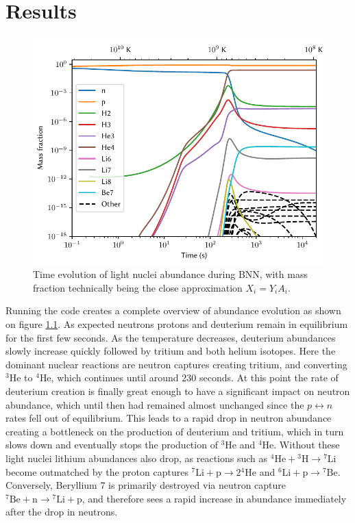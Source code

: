 \chapter{Results}
\label{chap:Results}
\begin{figure}[ht]
    \includegraphics[width=5.1in]{figures/abundancelight.pdf}
    \caption{Time evolution of light nuclei abundance during BNN, with mass fraction technically being the close approximation $X_i=Y_i A_i$. }
    \label{fig:lightXevo}
\end{figure}
Running the code creates a complete overview of abundance evolution as shown on figure \ref{fig:lightXevo}. As expected neutrons protons and deuterium remain in equilibrium for the first few seconds. As the temperature decreases, deuterium abundances slowly increase quickly followed by tritium and both helium isotopes. Here the dominant nuclear reactions are neutron captures creating tritium, and converting ${}^3$He to ${}^4$He, which continues until around 230 seconds. At this point the rate of deuterium creation is finally great enough to have a significant impact on neutron abundance, which until then had remained almost unchanged since the $p\leftrightarrow n$ rates fell out of equilibrium. This leads to a rapid drop in neutron abundance creating a bottleneck on the production of deuterium and tritium, which in turn slows down and eventually stops the production of ${}^3$He and ${}^4$He. Without these light nuclei lithium abundances also drop, as reactions such as ${}^4\text{He}+{}^3\text{H}\rightarrow {}^7\text{Li}$ become outmatched by the proton captures ${}^7\text{Li}+\text{p}\rightarrow 2{}^4\text{He}$ and ${}^6\text{Li}+\text{p}\rightarrow {}^7\text{Be}$. Conversely, Beryllium 7 is primarily destroyed via neutron capture ${}^7\text{Be}+\text{n}\rightarrow {}^7\text{Li}+\text{p}$, and therefore sees a rapid increase in abundance immediately after the drop in neutrons.
